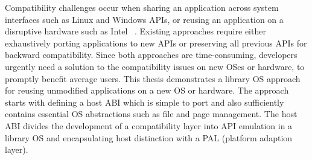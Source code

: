 \placeholder{}


Compatibility challenges occur when sharing an application across system interfaces such as Linux and Windows APIs,
or reusing an application on a disruptive hardware
such as Intel \sgx{}~\cite{intelsgx}.
Existing approaches require either
exhaustively porting applications to new APIs
or preserving all previous APIs for backward compatibility. %
Since both approaches are time-consuming, developers
urgently need a solution to the compatibility issues
on new OSes or hardware,
to promptly benefit average users.
This thesis demonstrates a library OS approach
for reusing unmodified applications
on a new OS or hardware.
The approach
starts with
defining a host ABI
which is simple to port
and also sufficiently
contains essential OS abstractions
such as file and page management.
The host ABI divides the development of a compatibility layer
into API emulation in a library OS and encapsulating host distinction with a PAL (platform adaption layer).



 
 






